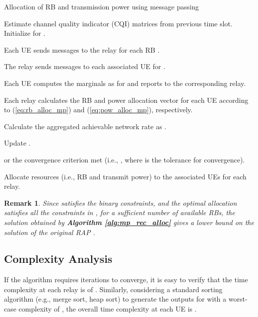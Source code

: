 \documentclass[twocolumn,10pt]{IEEEtran}
\newtheorem{remark}{Remark}
\begin{document}
\begin{algorithm*}
\caption{Allocation of RB and transmission power using message passing}
\label{alg:mp_rec_alloc}
\begin{algorithmic}[1]   


\STATE Estimate channel quality indicator (CQI) matrices from previous time slot.
\STATE Initialize  for .


\REPEAT 



\STATE Each UE  sends messages  to the relay  for each RB .

\STATE The relay  sends messages  to each associated UE  for .

\STATE Each UE  computes the marginals as  for  and reports to the corresponding relay. 

\STATE Each relay  calculates the RB and power allocation vector for each UE according to (\ref{eq:rb_alloc_mp}) and (\ref{eq:pow_alloc_mp}), respectively.

\STATE Calculate the aggregated achievable network rate as .   

\STATE Update .

\UNTIL  or the convergence criterion met (i.e., , where  is the  tolerance for convergence).

\STATE  Allocate resources (i.e., RB and transmit power) to the associated UEs for each relay. 

\end{algorithmic}
\end{algorithm*}

\begin{remark}
\label{rem:algo_bound}
Since  satisfies the binary constraints, and the optimal allocation   satisfies all the constraints in , for a sufficient number of available RBs, the solution obtained by {\normalfont \textbf{Algorithm \ref{alg:mp_rec_alloc}} } gives a lower bound on the solution of the original RAP .
\end{remark}


\subsection{Complexity Analysis}

If the algorithm requires  iterations to converge, it is easy to verify that the time complexity at each relay  is of . Similarly, considering a standard sorting algorithm (e.g., merge sort, heap sort) to generate the outputs  for  with a worst-case complexity of , the overall time complexity at each UE is . 
\end{document}
